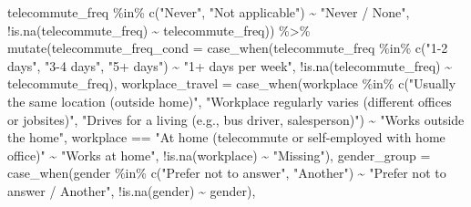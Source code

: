 \documentclass[
  12pt,
]{article}
\newenvironment{Shaded}{\begin{snugshade}}{\end{snugshade}}
\newcommand{\AttributeTok}[1]{\textcolor[rgb]{0.77,0.63,0.00}{#1}}
\newcommand{\FunctionTok}[1]{\textcolor[rgb]{0.00,0.00,0.00}{#1}}
\newcommand{\NormalTok}[1]{#1}
\newcommand{\SpecialCharTok}[1]{\textcolor[rgb]{0.00,0.00,0.00}{#1}}
\newcommand{\StringTok}[1]{\textcolor[rgb]{0.31,0.60,0.02}{#1}}
\begin{document}
\begin{Shaded}
\begin{Highlighting}[]
\NormalTok{                                          telecommute\_freq }\SpecialCharTok{\%in\%} \FunctionTok{c}\NormalTok{(}\StringTok{"Never"}\NormalTok{, }\StringTok{"Not applicable"}\NormalTok{) }\SpecialCharTok{\textasciitilde{}} \StringTok{"Never / None"}\NormalTok{,}
                                          \SpecialCharTok{!}\FunctionTok{is.na}\NormalTok{(telecommute\_freq) }\SpecialCharTok{\textasciitilde{}}\NormalTok{ telecommute\_freq)) }\SpecialCharTok{\%\textgreater{}\%} 
      \FunctionTok{mutate}\NormalTok{(}\AttributeTok{telecommute\_freq\_cond =} \FunctionTok{case\_when}\NormalTok{(telecommute\_freq }\SpecialCharTok{\%in\%} \FunctionTok{c}\NormalTok{(}\StringTok{"1{-}2 days"}\NormalTok{, }\StringTok{"3{-}4 days"}\NormalTok{, }\StringTok{"5+ days"}\NormalTok{)}
                                                 \SpecialCharTok{\textasciitilde{}} \StringTok{"1+ days per week"}\NormalTok{,}
                                               \SpecialCharTok{!}\FunctionTok{is.na}\NormalTok{(telecommute\_freq) }\SpecialCharTok{\textasciitilde{}}\NormalTok{ telecommute\_freq),}
             \AttributeTok{workplace\_travel =} \FunctionTok{case\_when}\NormalTok{(workplace }\SpecialCharTok{\%in\%} \FunctionTok{c}\NormalTok{(}\StringTok{"Usually the same location (outside home)"}\NormalTok{,}
                                                           \StringTok{"Workplace regularly varies (different offices or jobsites)"}\NormalTok{,}
                                                           \StringTok{"Drives for a living (e.g., bus driver, salesperson)"}\NormalTok{)}
                                            \SpecialCharTok{\textasciitilde{}} \StringTok{"Works outside the home"}\NormalTok{,}
\NormalTok{                                          workplace }\SpecialCharTok{==} \StringTok{"At home (telecommute or self{-}employed with home office)"}
                                            \SpecialCharTok{\textasciitilde{}} \StringTok{"Works at home"}\NormalTok{,}
                                          \SpecialCharTok{!}\FunctionTok{is.na}\NormalTok{(workplace) }\SpecialCharTok{\textasciitilde{}} \StringTok{"Missing"}\NormalTok{),}
             \AttributeTok{gender\_group =} \FunctionTok{case\_when}\NormalTok{(gender }\SpecialCharTok{\%in\%} \FunctionTok{c}\NormalTok{(}\StringTok{"Prefer not to answer"}\NormalTok{, }\StringTok{"Another"}\NormalTok{)}
                                        \SpecialCharTok{\textasciitilde{}} \StringTok{"Prefer not to answer / Another"}\NormalTok{,}
                                      \SpecialCharTok{!}\FunctionTok{is.na}\NormalTok{(gender) }\SpecialCharTok{\textasciitilde{}}\NormalTok{ gender),}

\end{Highlighting}
\end{Shaded}
\end{document}
